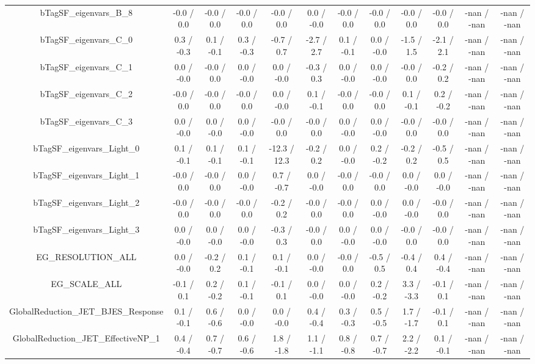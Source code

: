 \begin{table}[htbp]
\begin{center}
\begin{tabular}{|c|c|c|c|c|c|c|c|c|c|c|c|}
  bTagSF_eigenvars_B_8 & -0.0 / 0.0 & -0.0 / 0.0 & -0.0 / 0.0 & -0.0 / 0.0 & 0.0 / -0.0 & -0.0 / 0.0 & -0.0 / 0.0 & -0.0 / 0.0 & -0.0 / 0.0 & -nan / -nan & -nan / -nan \\ 
  bTagSF_eigenvars_C_0 & 0.3 / -0.3 & 0.1 / -0.1 & 0.3 / -0.3 & -0.7 / 0.7 & -2.7 / 2.7 & 0.1 / -0.1 & 0.0 / -0.0 & -1.5 / 1.5 & -2.1 / 2.1 & -nan / -nan & -nan / -nan \\ 
  bTagSF_eigenvars_C_1 & 0.0 / -0.0 & -0.0 / 0.0 & 0.0 / -0.0 & 0.0 / -0.0 & -0.3 / 0.3 & 0.0 / -0.0 & 0.0 / -0.0 & -0.0 / 0.0 & -0.2 / 0.2 & -nan / -nan & -nan / -nan \\ 
  bTagSF_eigenvars_C_2 & -0.0 / 0.0 & -0.0 / 0.0 & -0.0 / 0.0 & 0.0 / -0.0 & 0.1 / -0.1 & -0.0 / 0.0 & -0.0 / 0.0 & 0.1 / -0.1 & 0.2 / -0.2 & -nan / -nan & -nan / -nan \\ 
  bTagSF_eigenvars_C_3 & 0.0 / -0.0 & 0.0 / -0.0 & 0.0 / -0.0 & -0.0 / 0.0 & -0.0 / 0.0 & 0.0 / -0.0 & 0.0 / -0.0 & -0.0 / 0.0 & -0.0 / 0.0 & -nan / -nan & -nan / -nan \\ 
  bTagSF_eigenvars_Light_0 & 0.1 / -0.1 & 0.1 / -0.1 & 0.1 / -0.1 & -12.3 / 12.3 & -0.2 / 0.2 & 0.0 / -0.0 & 0.2 / -0.2 & -0.2 / 0.2 & -0.5 / 0.5 & -nan / -nan & -nan / -nan \\ 
  bTagSF_eigenvars_Light_1 & -0.0 / 0.0 & -0.0 / 0.0 & 0.0 / -0.0 & 0.7 / -0.7 & 0.0 / -0.0 & -0.0 / 0.0 & -0.0 / 0.0 & 0.0 / -0.0 & 0.0 / -0.0 & -nan / -nan & -nan / -nan \\ 
  bTagSF_eigenvars_Light_2 & -0.0 / 0.0 & -0.0 / 0.0 & -0.0 / 0.0 & -0.2 / 0.2 & -0.0 / 0.0 & -0.0 / 0.0 & 0.0 / -0.0 & 0.0 / -0.0 & -0.0 / 0.0 & -nan / -nan & -nan / -nan \\ 
  bTagSF_eigenvars_Light_3 & 0.0 / -0.0 & 0.0 / -0.0 & 0.0 / -0.0 & -0.3 / 0.3 & -0.0 / 0.0 & 0.0 / -0.0 & 0.0 / -0.0 & -0.0 / 0.0 & -0.0 / 0.0 & -nan / -nan & -nan / -nan \\ 
  EG_RESOLUTION_ALL & 0.0 / -0.0 & -0.2 / 0.2 & 0.1 / -0.1 & 0.1 / -0.1 & 0.0 / -0.0 & -0.0 / 0.0 & -0.5 / 0.5 & -0.4 / 0.4 & 0.4 / -0.4 & -nan / -nan & -nan / -nan \\ 
  EG_SCALE_ALL & -0.1 / 0.1 & 0.2 / -0.2 & 0.1 / -0.1 & -0.1 / 0.1 & 0.0 / -0.0 & 0.0 / -0.0 & 0.2 / -0.2 & 3.3 / -3.3 & -0.1 / 0.1 & -nan / -nan & -nan / -nan \\ 
  GlobalReduction_JET_BJES_Response & 0.1 / -0.1 & 0.6 / -0.6 & 0.0 / -0.0 & 0.0 / -0.0 & 0.4 / -0.4 & 0.3 / -0.3 & 0.5 / -0.5 & 1.7 / -1.7 & -0.1 / 0.1 & -nan / -nan & -nan / -nan \\ 
  GlobalReduction_JET_EffectiveNP_1 & 0.4 / -0.4 & 0.7 / -0.7 & 0.6 / -0.6 & 1.8 / -1.8 & 1.1 / -1.1 & 0.8 / -0.8 & 0.7 / -0.7 & 2.2 / -2.2 & 0.1 / -0.1 & -nan / -nan & -nan / -nan \\ 

\end{tabular}
\end{center}
\end{table}
